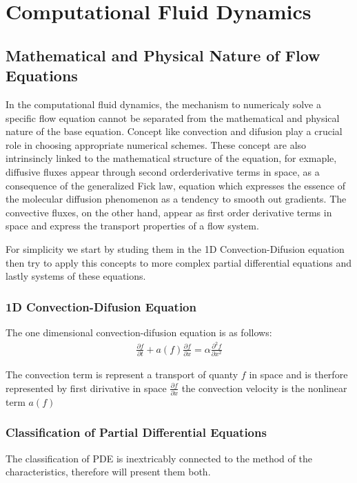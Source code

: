 \chapter{Computational Fluid Dynamics}



\section{Mathematical and Physical Nature of Flow Equations}
In the computational fluid dynamics, the mechanism to numericaly solve a
specific flow equation cannot be separated from the mathematical and
physical nature of the base equation. 
Concept like convection and difusion play a crucial role in choosing appropriate
numerical schemes. These concept are also intrinsincly linked to the
mathematical structure of the equation, for exmaple, diffusive fluxes appear through second orderderivative terms in space, as a consequence of the generalized Fick law, equation which expresses 
the essence of the molecular diffusion phenomenon as a tendency to smooth out gradients. 
The convective fluxes, on the other hand, appear as first order derivative terms in space and 
express the transport properties of a flow system.

For simplicity we start by studing them in the 1D Convection-Difusion equation then try to apply this concepts 
to more complex partial differential equations and lastly systems of these equations.


\subsection{1D Convection-Difusion Equation}
The one dimensional convection-difusion equation is as follows:
\begin{eqnarray}
	\frac{\partial f}{\partial t} + a(f) \frac{\partial f}{\partial x} = \alpha \frac{\partial^2 f}{\partial x^2}
\end{eqnarray}

The convection term is represent a transport of quanty $f$ in space and is therfore represented by first dirivative in space $\frac{\partial f}{\partial x}$ the convection velocity is the nonlinear term $a(f)$




\subsection{Classification of Partial Differential Equations}
The classification of PDE is inextricably connected to the method of the characteristics, 
therefore will present them both.























